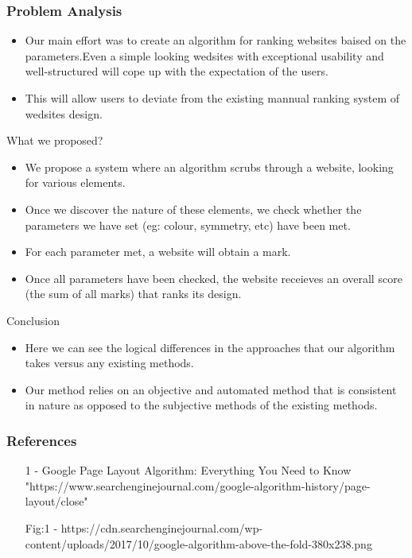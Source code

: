 \documentclass[11pt]{beamer}
\begin{document}
\begin{frame}
\frametitle{{Problem Analysis}}
\begin{itemize}
	\item Our main effort was to create an algorithm for ranking websites baised on the parameters.Even a simple looking wedsites with exceptional usability and well-structured will cope up with the expectation of the users.
	
	\item This will allow users to deviate from the existing mannual ranking system of wedsites design.
\end{itemize}
\end{frame}



		\begin{frame}{What we proposed?}
			\begin{itemize}
				\item We propose a system where an algorithm scrubs through a website, looking for various elements.
				\item Once we discover the nature of these elements, we check whether the parameters we have set (eg: colour, symmetry, etc) have been met.
				\item For each parameter met, a website will obtain a mark.
				\item Once all parameters have been checked, the website receieves an overall score (the sum of all marks) that ranks its design.
					\end{itemize}	
	\end{frame}
	\begin{frame}{Conclusion}
		\begin{itemize}
			\item Here we can see the logical differences in the approaches that our algorithm takes versus any existing methods.
			\item Our method relies on an objective and automated method that is consistent in nature as opposed to the subjective methods of the existing methods.
		\end{itemize}
	\end{frame}
	\begin{frame}
		\frametitle{\LARGE \textbf{References}}
		\begin{itemize}
			\item [1] - Google Page Layout Algorithm: Everything You Need to Know 
			"https://www.searchenginejournal.com/google-algorithm-history/page-layout/close"
			\item [Fig:1] - https://cdn.searchenginejournal.com/wp-content/uploads/2017/10/google-algorithm-above-the-fold-380x238.png
		\end{itemize}
	\end{frame}
\end{document}
